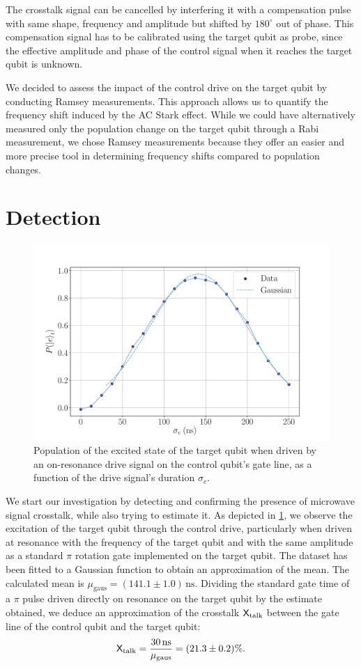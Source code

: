 The crosstalk signal can be cancelled by interfering it with a  compensation pulse with same shape, frequency and amplitude but shifted by  $180^\circ $ out of phase.
This compensation signal has to be calibrated using the target qubit as probe, since the effective amplitude and phase of the control signal when it reaches the target qubit is unknown.

We decided to assess the impact of the control drive on the target qubit by conducting Ramsey measurements.
This approach allows us to quantify the frequency shift induced by the AC Stark effect.
While we could have alternatively measured only the population change on the target qubit through a Rabi measurement, we chose Ramsey measurements because they offer an easier and more precise tool in determining frequency shifts compared to population changes.

\section{Detection}

\begin{figure}[t!]
    \centering
    \includegraphics[width = 0.8 \textwidth]{Images/Chap2.0/sigma.pdf}
    \caption{Population of the excited state of the target qubit when driven by an on-resonance drive signal on the control qubit's gate line, as a function of the drive signal's duration $\sigma_c$.}
    \label{fig:sigmas}
\end{figure}

We start our investigation by detecting and confirming the presence of microwave signal crosstalk, while also trying to estimate it.
As depicted in \cref{fig:sigmas}, we observe the excitation of the target qubit through the control drive, particularly when driven at resonance with the frequency of the target qubit and with the same amplitude as a standard $\pi$ rotation gate implemented on the target qubit.
The dataset has been fitted to a Gaussian function to obtain an approximation of the mean.
The calculated mean is $\mu_\text{gaus} = (141.1 \pm 1.0) \, \text{ns}$.
Dividing the standard gate time of a $\pi$ pulse driven directly on resonance on the target qubit by the estimate obtained, we deduce an approximation of the crosstalk $\mathsf{X}_{\text{talk}}$ between the gate line of the control qubit and the target qubit:
\begin{equation}
\mathsf{X}_{\text{talk}} = \frac{\SI{30}{ns}}{\mu_\text{gaus}} = (21.3 \pm 0.2) \% .
\end{equation}

